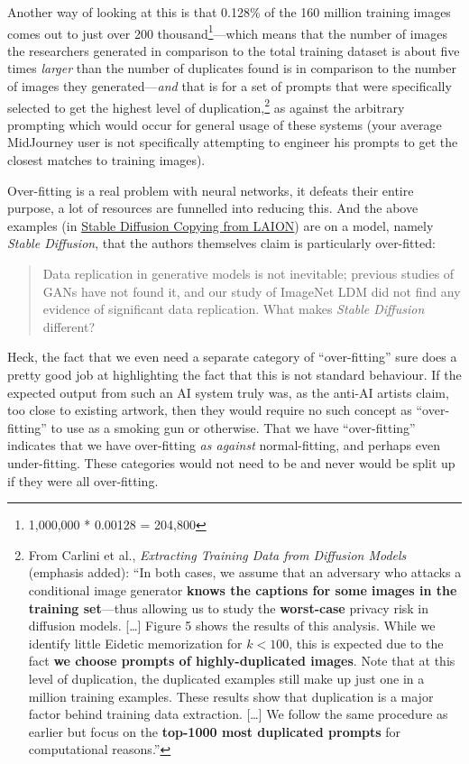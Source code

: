 \documentclass[11pt]{article}
\begin{document}
Another way of looking at this is that 0.128\% of the 160 million training images comes out to just over 200 thousand\footnote{1,000,000 * 0.00128 = 204,800}---which means that the number of images the researchers generated in comparison to the total training dataset is about five times \emph{larger} than the number of duplicates found is in comparison to the number of images they generated---\emph{and} that is for a set of prompts that were specifically selected to get the highest level of duplication,\footnote{From Carlini et al., \emph{Extracting Training Data from Diffusion Models} (emphasis added): ``In both cases, we assume that an adversary who attacks a conditional image generator \textbf{knows the captions for some images in the training set}---thus allowing us to study the \textbf{worst-case} privacy risk in diffusion models. [\ldots{}] Figure 5 shows the results of this analysis. While we identify little Eidetic memorization for \(k < 100\), this is expected due to the fact \textbf{we choose prompts of highly-duplicated images}. Note that at this level of duplication, the duplicated examples still make up just one in a million training examples. These results show that duplication is a major factor behind training data extraction. [\ldots{}] We follow the same procedure as earlier but focus on the \textbf{top-1000 most duplicated prompts} for computational reasons.''} as against the arbitrary prompting which would occur for general usage of these systems (your average MidJourney user is not specifically attempting to engineer his prompts to get the closest matches to training images).

Over-fitting is a real problem with neural networks, it defeats their entire purpose, a lot of resources are funnelled into reducing this. And the above examples (in \hyperref[sec:org081553f]{Stable Diffusion Copying from LAION}) are on a model, namely \emph{Stable Diffusion}, that the authors themselves claim is particularly over-fitted:
\begin{quote}
Data replication in generative models is not inevitable; previous studies of GANs have not found it, and our study of ImageNet LDM did not find any evidence of significant data replication. What makes \emph{Stable Diffusion} different?
\end{quote}

Heck, the fact that we even need a separate category of ``over-fitting'' sure does a pretty good job at highlighting the fact that this is not standard behaviour. If the expected output from such an AI system truly was, as the anti-AI artists claim, too close to existing artwork, then they would require no such concept as ``over-fitting'' to use as a smoking gun or otherwise. That we have ``over-fitting'' indicates that we have over-fitting \emph{as against} normal-fitting, and perhaps even under-fitting. These categories would not need to be and never would be split up if they were all over-fitting.
\end{document}
